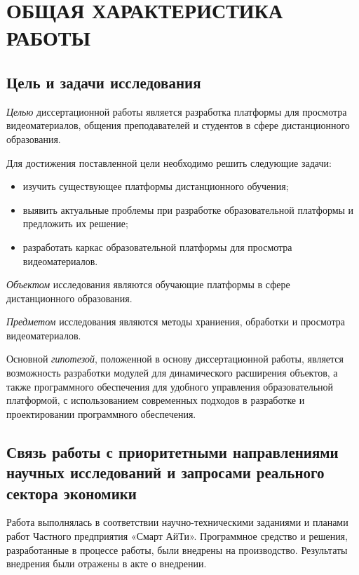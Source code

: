 \section*{ОБЩАЯ ХАРАКТЕРИСТИКА РАБОТЫ}

\subsection*{Цель и задачи исследования}

\textit{Целью} диссертационной работы является разработка платформы для просмотра видеоматериалов,
общения преподавателей и студентов в сфере дистанционного образования.

Для достижения поставленной цели необходимо решить следующие задачи:
\begin{itemize}
  \item изучить существующее платформы дистанционного обучения;
  \item выявить актуальные проблемы при разработке образовательной платформы и предложить их решение;
  \item разработать каркас образовательной платформы для просмотра видеоматериалов.
\end{itemize}

\textit{Объектом} исследования являются обучающие платформы в сфере дистанционного образования.


\textit{Предметом} исследования являются методы храниения, обработки и просмотра видеоматериалов.

Основной \textit{гипотезой}, положенной в основу диссертационной работы, является возможность разработки
модулей для динамического расширения объектов, а также программного обеспечения для удобного
управления образовательной платформой, с использованием современных подходов в разработке
и проектировании программного обеспечения.

\subsection*{Связь работы с приоритетными направлениями научных исследований и запросами реального сектора
экономики}

Работа выполнялась в соответствии научно-техническими заданиями и планами работ
Частного предприятия «Смарт АйТи». Программное средство и решения, разработанные в процессе работы,
были внедрены на производство. Результаты внедрения были отражены в акте о внедрении.

